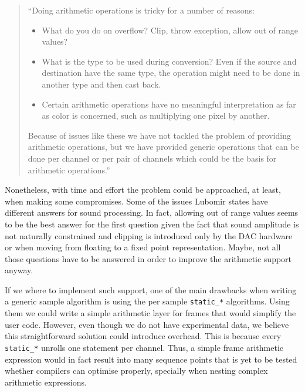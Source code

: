 \begin{quotation}
``Doing arithmetic operations is tricky for a number of reasons:

\begin{itemize}
\item What do you do on overflow? Clip, throw exception, allow out of
  range values?

\item What is the type to be used during conversion? Even if the
  source and destination have the same type, the operation might need
  to be done in another type and then cast back.

\item Certain arithmetic operations have no meaningful interpretation
  as far as color is concerned, such as multiplying one pixel by
  another. 
\end{itemize}

Because of issues like these we have not tackled the problem of
providing arithmetic operations, but we have provided generic
operations that can be done per channel or per pair of channels which
could be the basis for arithmetic operations.''
\end{quotation}

Nonetheless, with time and effort the problem could be approached, at
least, when making some compromises. Some of the issues Lubomir states
have different answers for sound processing. In fact, allowing out of
range values seems to be the best answer for the first question given
the fact that sound amplitude is not naturally constrained and
clipping is introduced only by the DAC hardware or when moving from
floating to a fixed point representation. Maybe, not all those
questions have to be answered in order to improve the arithmetic
support anyway.

If we where to implement such support, one of the main drawbacks when
writing a generic sample algorithm is using the per sample
\texttt{static\_*} algorithms. Using them we could write a simple
arithmetic layer for frames that would simplify the user
code. However, even though we do not have experimental data, we
believe this straightforward solution could introduce overhead. This
is because every \texttt{static\_*} unrolls one statement per
channel. Thus, a simple frame arithmetic expression would in fact
result into many sequence points that is yet to be tested whether
compilers can optimise properly, specially when nesting complex
arithmetic expressions.

